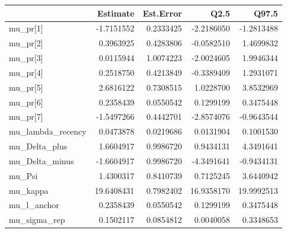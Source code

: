 
\begin{tabular}{lrrrr}
\toprule
  & Estimate & Est.Error & Q2.5 & Q97.5\\
\midrule
mu\_pr[1] & -1.7151552 & 0.2333425 & -2.2186050 & -1.2813488\\
mu\_pr[2] & 0.3963925 & 0.4283806 & -0.0582510 & 1.4699832\\
mu\_pr[3] & 0.0115944 & 1.0074223 & -2.0024605 & 1.9946344\\
mu\_pr[4] & 0.2518750 & 0.4213849 & -0.3389409 & 1.2931071\\
mu\_pr[5] & 2.6816122 & 0.7308515 & 1.0228700 & 3.8532969\\
\addlinespace
mu\_pr[6] & 0.2358439 & 0.0550542 & 0.1299199 & 0.3475448\\
mu\_pr[7] & -1.5497266 & 0.4442701 & -2.8574076 & -0.9643544\\
mu\_lambda\_recency & 0.0473878 & 0.0219686 & 0.0131904 & 0.1001530\\
mu\_Delta\_plus & 1.6604917 & 0.9986720 & 0.9434131 & 4.3491641\\
mu\_Delta\_minus & -1.6604917 & 0.9986720 & -4.3491641 & -0.9434131\\
\addlinespace
mu\_Psi & 1.4300317 & 0.8410739 & 0.7125245 & 3.6440942\\
mu\_kappa & 19.6408431 & 0.7982402 & 16.9358170 & 19.9992513\\
mu\_l\_anchor & 0.2358439 & 0.0550542 & 0.1299199 & 0.3475448\\
mu\_sigma\_rep & 0.1502117 & 0.0854812 & 0.0040058 & 0.3348653\\
\bottomrule
\end{tabular}
